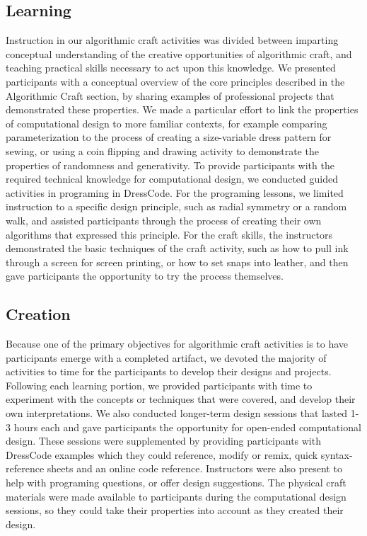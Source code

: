 \documentclass{sigchi}
\begin{document}
\subsection{Learning}
Instruction in our algorithmic craft activities was divided between imparting conceptual understanding of the creative opportunities of algorithmic craft, and teaching practical skills necessary to act upon this knowledge. We presented participants with a conceptual overview of the core principles described in the Algorithmic Craft section, by sharing examples of professional projects that demonstrated these properties. We made a particular effort to link the properties of computational design to more familiar contexts, for example comparing parameterization to the process of creating a size-variable dress pattern for sewing, or using a coin flipping and drawing activity to demonstrate the properties of randomness and generativity.  To provide participants with the required technical knowledge for computational design, we conducted guided activities in programing in DressCode. For the programing lessons, we limited instruction to a specific design principle, such as radial symmetry or a random walk, and assisted participants through the process of creating their own algorithms that expressed this principle. For the craft skills, the instructors demonstrated the basic techniques of the craft activity, such as how to pull ink through a screen for screen printing, or how to set snaps into leather, and then gave participants the opportunity to try the process themselves.

\subsection{Creation}
Because one of the primary objectives for algorithmic craft activities is to have participants emerge with a completed artifact, we devoted the majority of activities to time for the participants to develop their designs and projects. Following each learning portion, we provided participants with time to experiment with the concepts or techniques that were covered, and develop their own interpretations. We also conducted longer-term design sessions that lasted 1-3 hours each and gave participants the opportunity for open-ended computational design. These sessions were supplemented by providing participants with DressCode examples which they could reference, modify or remix, quick syntax-reference sheets and an online code reference. Instructors were also present to help with programing questions, or offer design suggestions. The physical craft materials were made available to participants during the computational design sessions, so they could take their properties into account as they created their design. 
\end{document}
